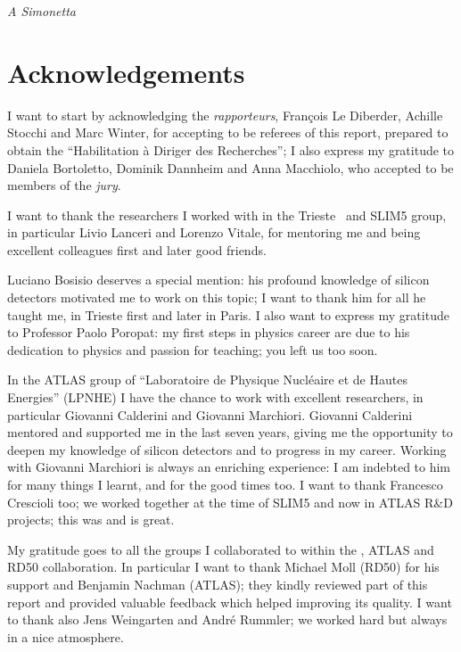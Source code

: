\vspace*{4cm}
\begin{flushright}
{\itshape A Simonetta
}
\end{flushright}



\chapter*{Acknowledgements}

I want to start by acknowledging the {\it rapporteurs}, Fran\c{c}ois Le Diberder, Achille Stocchi and Marc 
Winter, for accepting 
to be referees of this  report, prepared to obtain the  ``Habilitation \`a Diriger des Recherches''; I 
also express my gratitude to Daniela Bortoletto, Dominik Dannheim  and Anna Macchiolo, who 
accepted to be members of the {\it jury}.

I want to thank the researchers I worked with in the Trieste \babar\ and SLIM5 group, 
in particular Livio Lanceri and Lorenzo Vitale, for mentoring me and being excellent colleagues first 
and later good friends. 

\noindent Luciano Bosisio deserves a special mention: his profound knowledge of silicon detectors 
 motivated me to work on this topic; I want to thank him for all he taught me, in Trieste first and later 
 in Paris.
I also want  to express my gratitude to Professor Paolo Poropat: my first steps in
physics career are due to his dedication to physics and passion for teaching; you left us too soon.

In the ATLAS group of ``Laboratoire de Physique Nucl\'eaire et de Hautes Energies'' (LPNHE) I have
the chance to work with excellent researchers, in particular Giovanni Calderini and Giovanni Marchiori. 
Giovanni Calderini mentored and supported me in the last seven years, giving me the opportunity  
to deepen my knowledge of silicon detectors and to progress in my career. 
Working with Giovanni Marchiori is  always an enriching experience: I am indebted to him for 
many things I learnt, and for the good times too. 
I want to thank Francesco Crescioli too; we worked together at the time of SLIM5 and now in 
ATLAS R\&D projects; this was and is great. 

My gratitude goes to all the groups I collaborated to within the \babar, ATLAS and RD50 collaboration. 
In particular I want to thank Michael Moll (RD50) for his support and Benjamin Nachman (ATLAS); 
they kindly reviewed part of this report and provided valuable feedback which helped improving its quality. 
I want to thank also Jens Weingarten and Andr\'e Rummler; we worked hard but always in a nice 
atmosphere.
 


